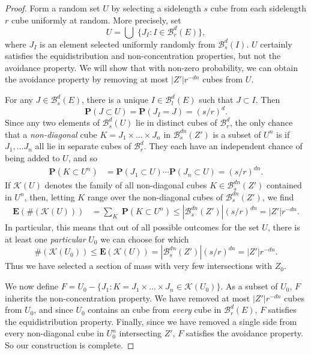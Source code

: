 \documentclass[usenames,dvipsnames]{article}
\theoremstyle{plain}
\theoremstyle{plain}
\begin{document}
\begin{proof}
	Form a random set $U$ by selecting a sidelength $s$ cube from each sidelength $r$ cube uniformly at random. More precisely, set
	\[ U = \bigcup\; \{ J_I: I \in \mathcal{B}^d_r(E) \}, \]
	where $J_I$ is an element selected uniformly randomly from $\mathcal{B}^d_s(I)$. $U$ certainly satisfies the equidistribution and non-concentration properties, but not the avoidance property. We will show that with non-zero probability, we can obtain the avoidance property by removing at most $|Z'|r^{-dn}$ cubes from $U$.

	For any $J \in \mathcal{B}^d_s(E)$, there is a unique $I \in \mathcal{B}^d_l(E)$ such that $J \subset I$. Then
	\[ \mathbf{P}(J \subset U) = \mathbf{P}(J_I = J) = (s/r)^d. \]
	Since any two elements of $\mathcal{B}^d_s(U)$ lie in distinct cubes of $\mathcal{B}^d_r$, the only chance that a {\it non-diagonal} cube $K = J_1 \times \dots \times J_n$ in $\mathcal{B}^{dn}_s(Z')$ is a subset of $U^n$ is if $J_1, \dots J_n$ all lie in separate cubes of $\mathcal{B}^d_r$. They each have an independent chance of being added to $U$, and so
	\begin{align*}
		\mathbf{P}(K \subset U^n) &= \mathbf{P}(J_1 \subset U) \cdots \mathbf{P}(J_n \subset U) = (s/r)^{dn}.
	\end{align*}
	If $\mathcal{K}(U)$ denotes the family of all non-diagonal cubes $K \in \mathcal{B}^{dn}_s(Z')$ contained in $U^n$, then, letting $K$ range over the non-diagonal cubes of $\mathcal{B}^{dn}_s(Z')$, we find
	\begin{align*}
		\mathbf{E}(\# (\mathcal{K}(U))) &= {\sum}_K\; \mathbf{P}(K \subset U^n) \leq |\mathcal{B}^{dn}_s(Z')| (s/r)^{dn} = |Z'| r^{-dn}.
	\end{align*}
	In particular, this means that out of all possible outcomes for the set $U$, there is at least one {\it particular} $U_0$ we can choose for which
	\[ \#(\mathcal{K}(U_0)) \leq \mathbf{E}(\mathcal{K}(U)) = |\mathcal{B}^{dn}_s(Z')| (s/r)^{dn} = |Z'| r^{-dn}. \]
	Thus we have selected a section of mass with very few intersections with $Z_0$.

	We now define $F = U_0 - \{ J_1 : K = J_1 \times \dots \times J_n \in \mathcal{K}(U_0) \}$. As a subset of $U_0$, $F$ inherits the non-concentration property. We have removed at most $|Z'| r^{-dn}$ cubes from $U_0$, and since $U_0$ contains an cube from {\it every} cube in $\mathcal{B}^d_r(E)$, $F$ satisfies the equidistribution property. Finally, since we have removed a single side from every non-diagonal cube in $U_0^n$ intersecting $Z'$, $F$ satisfies the avoidance property. So our construction is complete.
\end{proof}
\end{document}
